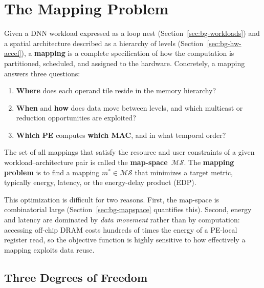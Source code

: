 \section{The Mapping Problem}
\label{sec:bg-mapping}

Given a DNN workload expressed as a loop nest
(Section~\ref{sec:bg-workloads}) and a spatial architecture described as
a hierarchy of levels (Section~\ref{sec:bg-hw-accel}), a
\textbf{mapping} is a complete specification of how the computation is
partitioned, scheduled, and assigned to the hardware.
Concretely, a mapping answers three questions:
\begin{enumerate}
  \item \textbf{Where} does each operand tile reside in the memory
    hierarchy?
  \item \textbf{When} and \textbf{how} does data move between levels,
    and which multicast or reduction opportunities are exploited?
  \item \textbf{Which PE} computes \textbf{which MAC}, and in what
    temporal order?
\end{enumerate}

The set of all mappings that satisfy the resource and user constraints
of a given workload--architecture pair is called the
\textbf{map-space}~$\mathcal{MS}$.
The \textbf{mapping problem} is to find a mapping
$m^{*}\!\in\mathcal{MS}$ that minimizes a target metric, typically
energy, latency, or the energy-delay product (EDP).

\noindent
This optimization is difficult for two reasons.
First, the map-space is combinatorial large
(Section~\ref{sec:bg-mapspace} quantifies this).
Second, energy and latency are dominated by \emph{data movement}
rather than by computation: accessing off-chip DRAM costs hundreds of
times the energy of a PE-local register read, so the objective function
is highly sensitive to how effectively a mapping exploits data reuse.

\subsection{Three Degrees of Freedom}
\label{sec:mapping-dof}

